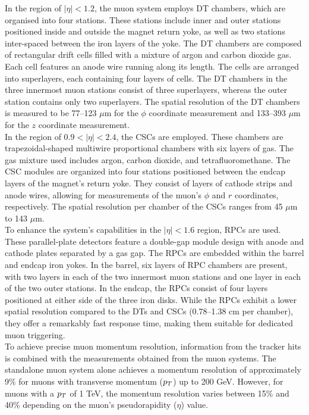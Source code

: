 In the region of $|\eta| < 1.2$, the muon system employs \ac{DT} chambers, which are organised into four stations. 
These stations include inner and outer stations positioned inside and outside the magnet return yoke, as well as two stations inter-spaced between the iron layers of the yoke. 
The \ac{DT} chambers are composed of rectangular drift cells filled with a mixture of argon and carbon dioxide gas. 
Each cell features an anode wire running along its length. 
The cells are arranged into superlayers, each containing four layers of cells. 
The \ac{DT} chambers in the three innermost muon stations consist of three superlayers, whereas the outer station contains only two superlayers. 
The spatial resolution of the \ac{DT} chambers is measured to be 77–123 $\mu$m for the $\phi$ coordinate measurement and 133–393 $\mu$m for the $z$ coordinate measurement. \\

In the region of $0.9 < |\eta| < 2.4$, the \ac{CSC}s are employed. 
These chambers are trapezoidal-shaped multiwire proportional chambers with six layers of gas. 
The gas mixture used includes argon, carbon dioxide, and tetrafluoromethane. 
The \ac{CSC} modules are organized into four stations positioned between the endcap layers of the magnet's return yoke. 
They consist of layers of cathode strips and anode wires, allowing for measurements of the muon's $\phi$ and $r$ coordinates, respectively. 
The spatial resolution per chamber of the \ac{CSC}s ranges from 45 $\mu$m to 143 $\mu$m. \\

To enhance the system's capabilities in the $|\eta| < 1.6$ region, \ac{RPC}s are used. 
These parallel-plate detectors feature a double-gap module design with anode and cathode plates separated by a gas gap. 
The \ac{RPC}s are embedded within the barrel and endcap iron yokes. In the barrel, six layers of \ac{RPC} chambers are present, with two layers in each of the two innermost muon stations and one layer in each of the two outer stations. 
In the endcap, the \ac{RPC}s consist of four layers positioned at either side of the three iron disks. 
While the \ac{RPC}s exhibit a lower spatial resolution compared to the \ac{DT}s and \ac{CSC}s (0.78–1.38 cm per chamber), they offer a remarkably fast response time, making them suitable for dedicated muon triggering. \\

To achieve precise muon momentum resolution, information from the tracker hits is combined with the measurements obtained from the muon systems. 
The standalone muon system alone achieves a momentum resolution of approximately 9\% for muons with transverse momentum ($p_{T}$) up to 200 GeV. 
However, for muons with a $p_{T}$ of 1 TeV, the momentum resolution varies between 15\% and 40\% depending on the muon's pseudorapidity ($\eta$) value.

